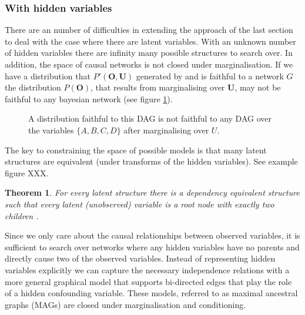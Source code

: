 \documentclass[11pt,a4paper,oneside]{book}
\theoremstyle{plain}
\newtheorem{theorem}{Theorem}
\theoremstyle{definition}
\begin{document}

\subsubsection{With hidden variables}
There are an number of difficulties in extending the approach of the last section to deal with the case where there are latent variables. With an unknown number of hidden variables there are infinity many possible structures to search over. In addition, the space of causal networks is not closed under marginalisation. If we have a distribution that $P'(\boldsymbol{O},\boldsymbol{U})$ generated by and is faithful to a network $G$ the distribution $P(\boldsymbol{O})$, that results from marginalising over $\boldsymbol{U}$, may not be faithful to any bayesian network (see figure \ref{fig:DAGSnotclosed}).

\begin{figure}
\centering
\caption{A distribution faithful to this DAG is not faithful to any DAG over the variables $\{A,B,C,D\}$ after marginalising over $U$. }
\label{fig:DAGSnotclosed}
\end{figure}
 

The key to constraining the space of possible models is that many latent structures are equivalent (under transforms of the hidden variables). See example figure XXX.

\begin{theorem}
\cite{Verma1993} For every latent structure there is a dependency equivalent structure such that every latent (unobserved) variable is a root node with exactly two children .
\end{theorem}

Since we only care about the causal relationships between observed variables, it is sufficient to search over networks where any hidden variables have no parents and directly cause two of the observed variables. Instead of representing hidden variables explicitly we can capture the necessary independence relations with a more general graphical model that supports bi-directed edges that play the role of a hidden confounding variable. These models, referred to as maximal ancestral graphs (MAGs) are closed under marginalisation and conditioning. 
\end{document}
